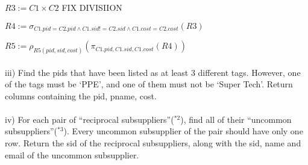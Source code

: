 \documentclass[10pt]{article}
\begin{document}
$R3 := C1 \times C2$ FIX DIVISIION

$R4 := \sigma_{C1.pid = C2.pid \wedge C1.sid != C2.sid \wedge C1.cost = C2.cost}(R3)$

$R5 := \rho_{R5(pid, sid, cost)}(\pi_{C1.pid, C1.sid, C1.cost}(R4))$
\\~\\
iii) Find the pids that have been listed as at least 3 different tags. However, one of the tags must be ‘PPE’, and one of them must not be ‘Super Tech’. Return columns containing the pid, pname, cost. 
\\~\\
iv) For each pair of “reciprocal subsuppliers”($^{*2}$), find all of their “uncommon subsuppliers”($^{*3}$). Every uncommon subsupplier of the pair should have only one row. Return the sid of the reciprocal subsuppliers, along with the sid, name and email of the uncommon subsupplier. 
\\~\\
\end{document}
